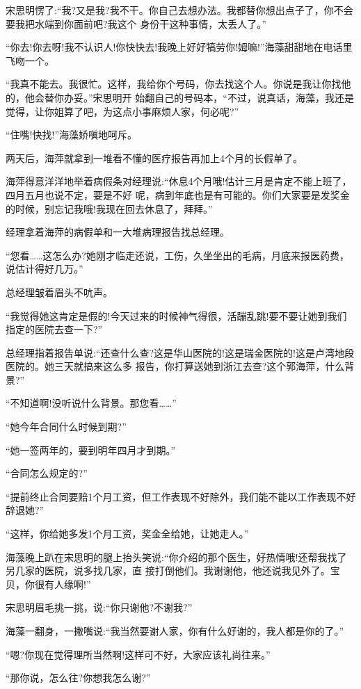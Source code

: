 \documentclass[11pt,a4paper,onecolumn]{article}
\begin{document}
宋思明愣了:``我?又是我?我不干。你自己去想办法。我都替你想出点子了，你不会要我把水端到你面前吧?我这个
身份干这种事情，太丢人了。''

``你去!你去呀!我不认识人!你快快去!我晚上好好犒劳你!姆嘛!''海藻甜甜地在电话里飞吻一个。

``我真不能去。我很忙。这样，我给你个号码，你去找这个人。你说是我让你找他的，他会替你办妥。''宋思明开
始翻自己的号码本，``不过，说真话，海藻，我还是觉得，让你姐算了吧，为这点小事麻烦人家，何必呢?''

``住嘴!快找!''海藻娇嗔地呵斥。

两天后，海萍就拿到一堆看不懂的医疗报告再加上4个月的长假单了。

海萍得意洋洋地举着病假条对经理说:``休息4个月哦!估计三月是肯定不能上班了，四月五月也说不定，要是不好
呢，病到年底也是有可能的。你们大家要是发奖金的时候，别忘记我哦!我现在回去休息了，拜拜。''

经理拿着海萍的病假单和一大堆病理报告找总经理。

``您看……这怎么办?她刚才临走还说，工伤，久坐坐出的毛病，月底来报医药费，说估计得好几万。''

总经理皱着眉头不吭声。

``我觉得她这肯定是假的!今天过来的时候神气得很，活蹦乱跳!要不要让她到我们指定的医院去查一下?''

总经理指着报告单说:``还查什么查?这是华山医院的!这是瑞金医院的!这是卢湾地段医院的。她三天就搞来这么多
报告，你打算送她到浙江去查?这个郭海萍，什么背景?''

``不知道啊!没听说什么背景。那您看……''

``她今年合同什么时候到期?''

``她一签两年的，要到明年四月才到期。''

``合同怎么规定的?''

``提前终止合同要赔1个月工资，但工作表现不好除外，我们能不能以工作表现不好辞退她?''

``这样，你给她多发1个月工资，奖金全给她，让她走人。''

海藻晚上趴在宋思明的腿上抬头笑说:``你介绍的那个医生，好热情哦!还帮我找了另几家的医院，说多找几家，直
接打倒他们。我谢谢他，他还说我见外了。宝贝，你很有人缘啊!''

宋思明眉毛挑一挑，说:``你只谢他?不谢我?''

海藻一翻身，一撇嘴说:``我当然要谢人家，你有什么好谢的，我人都是你的了。''

``嗯?你现在觉得理所当然啊!这样可不好，大家应该礼尚往来。''

``那你说，怎么往?你想我怎么谢?''
\end{document}
